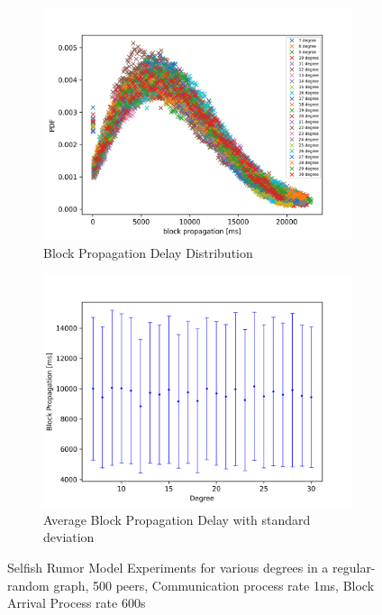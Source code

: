 \begin{figure}[ht]
	\begin{subfigure}[b]{0.48\textwidth}
		\includegraphics[width=\textwidth]{figures/propagation_histogram_degree_search_smaller.png}
		\caption{Block Propagation Delay Distribution }
		\label{fig:SRMblockprop}
	\end{subfigure}
	\hfill
	\begin{subfigure}[b]{0.48\textwidth}
		\includegraphics[width=\textwidth]{figures/avg_propagation_degree_search.png}
		\caption{Average Block Propagation Delay with standard deviation }
		\label{fig:SRMblockpropavg}
	\end{subfigure}
\caption{Selfish Rumor Model Experiments for various degrees in a regular-random graph, 500 peers, Communication process rate 1ms, Block Arrival Process rate 600s}
\end{figure}
